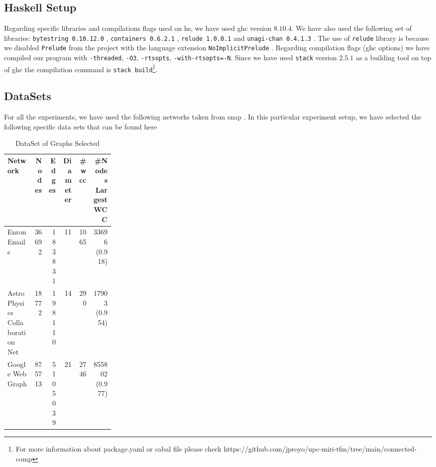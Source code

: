   \subsection{Haskell Setup}
  Regarding specific libraries and compilations flags used on \acrshort{hs}, we have used \acrshort{ghc} version $8.10.4$. We have also used the following set of libraries: \texttt{bytestring 0.10.12.0} \cite{bytestring}, \texttt{containers 0.6.2.1} \cite{containers}, \texttt{relude 1.0.0.1} \cite{relude} and \texttt{unagi-chan 0.4.1.3} \cite{unagi}. The use of \texttt{relude} library is because we disabled \texttt{Prelude} from the project with the language extension \texttt{NoImplicitPrelude} \cite{extensions}. Regarding compilation flags (\acrshort{ghc} options) we have compiled our program with \texttt{-threaded}, \texttt{-O3}, \texttt{-rtsopts}, \texttt{-with-rtsopts=-N}. Since we have used \texttt{stack} version $2.5.1$ \cite{stack} as a building tool on top of \acrshort{ghc} the compilation command is \texttt{stack build}\footnote{For more information about package.yaml or cabal file please check https://github.com/jproyo/upc-miri-tfm/tree/main/connected-comp}.
  
  \subsection{DataSets}\label{data:set}
  
  For all the experiments, we have used the following networks taken from \acrshort{snap} \cite{stanford}. In this particular experiment setup, we have selected the following specific data sets that can be found here \cite{netenron, netastro, netwebgoogle}
  
  \begin{table}[H]
    \centering
    \begin{tabular}{|p{0.25\linewidth}|r|r|r|r|r|}
     \hline
     \textbf{Network} & \textbf{Nodes} & \textbf{Edges} & \textbf{Diameter} & \textbf{\#\acrshort{wcc}} & \textbf{\#Nodes Largest WCC} \\
     \hline
     Enron Emails & 36692 & 183831 & 11 & 1065 & 33696 (0.918) \\
     \hline
     Astro Physics Collaboration Net & 18772 & 198110 & 14 & 290 & 17903 (0.954)\\
     \hline
     Google Web Graph & 875713 & 5105039 & 21 & 2746 & 855802 (0.977)\\
     \hline
    \end{tabular}
   \caption{DataSet of Graphs Selected}
   \label{table:4}
   \end{table}
   
